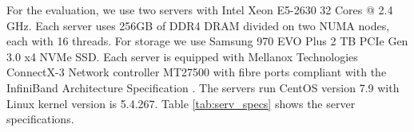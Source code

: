 For the evaluation, we use two servers with Intel Xeon E5-2630 32 Cores @ 2.4
GHz. Each server uses 256GB of DDR4 DRAM divided on two NUMA nodes, each with 16
threads. For storage we use Samsung 970 EVO Plus 2 TB PCIe Gen 3.0 x4 NVMe SSD.
Each server is equipped with Mellanox Technologies ConnectX-3 Network controller
MT27500 with fibre ports compliant with the InfiniBand Architecture
Specification . The servers run CentOS version 7.9 with Linux kernel version is
5.4.267. Table \ref{tab:serv_specs} shows the server specifications.
\begin{table}[H]
\caption{Server specifications table.}
\label{tab:serv_specs}
\end{table}

